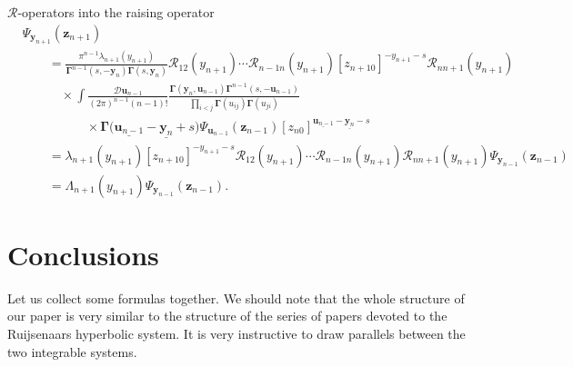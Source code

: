 \documentclass[pdftex]{sigma}
\numberwithin{equation}{section}
\begin{document}
$\mathcal{R}$-operators into the raising operator
\begin{align*}
&
\Psi_{\bm{y}_{n+1}}(\bm{z}_{n+1}) \\
& \qquad =
\frac{\pi^{n-1} \lambda_{n+1}(y_{n+1})}
{\mathbf{\Gamma}^{n-1}(s ,-\bm{y}_{n})
\mathbf{\Gamma}(s ,\bm{y}_{n})}
\mathcal{R}_{12}(y_{n+1})\cdots
\mathcal{R}_{n-1 n}(y_{n+1})
[z_{n+1 0}]^{-y_{n+1}-s} \mathcal{R}_{n n+1}(y_{n+1})\\
& \qquad\quad \times
\int \frac{\mathcal{D}\bm{u}_{n-1}}
{(2\pi)^{n-1} (n-1)!}
\frac{\mathbf{\Gamma}(\bm y_{n},\bm u_{n-1})
\mathbf{\Gamma}^{n-1}(s ,-\bm{u}_{n-1})}
{\prod\limits_{i<j}\mathbf{\Gamma}(u_{ij})\mathbf{\Gamma}(u_{ji})} \\
& \qquad\qquad\quad \times
\mathbf{\Gamma}\bigl(\underline{\bm{u}_{n-1}}-\underline{\bm{y}_{n}}+s\bigr)
\Psi_{\bm{u}_{n-1}}(\bm{z}_{n-1})
[z_{n 0}]^{\underline{\bm{u}_{n-1}}-
\underline{\bm{y}_{n}}-s} \\
& \qquad =
\lambda_{n+1}(y_{n+1})
[z_{n+1 0}]^{-y_{n+1}-s}
\mathcal{R}_{12}(y_{n+1})\cdots
\mathcal{R}_{n-1 n}(y_{n+1}) \mathcal{R}_{n n+1}(y_{n+1})
\Psi_{\bm{y}_{n-1}}(\bm{z}_{n-1}) \\
& \qquad =
\Lambda_{n+1}(y_{n+1}) \Psi_{\bm{y}_{n-1}}(\bm{z}_{n-1}) .
\end{align*}



\section{Conclusions}
\label{con}

Let us collect some formulas together.
We should note that the whole structure of our paper
is very similar to the structure of the series of
papers \cite{BDKK1,BDKK2,BDKK3,BDKK4} devoted to
the Ruijsenaars hyperbolic system.
It is very instructive to draw parallels between the two integrable systems.
\end{document}
